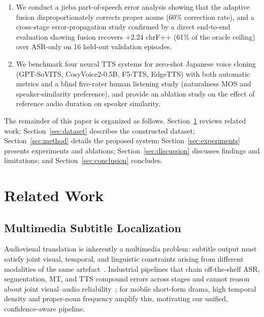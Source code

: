 \documentclass[mathematics,article,submit,xetex,moreauthors]{Definitions/mdpi}
\begin{document}
\begin{enumerate}
 \item We conduct a jieba part-of-speech error analysis showing that the adaptive fusion disproportionately corrects proper nouns (60\% correction rate), and a cross-stage error-propagation study confirmed by a direct end-to-end evaluation showing fusion recovers $+2.24$ chrF++ (61\% of the oracle ceiling) over ASR-only on 16 held-out validation episodes.
 \item We benchmark four neural TTS systems for zero-shot Japanese voice cloning (GPT-SoVITS, CosyVoice2-0.5B, F5-TTS, EdgeTTS) with both automatic metrics and a blind five-rater human listening study (naturalness MOS and speaker-similarity preference), and provide an ablation study on the effect of reference audio duration on speaker similarity.
\end{enumerate}

The remainder of this paper is organized as follows.
Section~\ref{sec:related} reviews related work; Section~\ref{sec:dataset} describes the constructed dataset; Section~\ref{sec:method} details the proposed system; Section~\ref{sec:experiments} presents experiments and ablations; Section~\ref{sec:discussion} discusses findings and limitations; and Section~\ref{sec:conclusion} concludes.

\section{Related Work}
\label{sec:related}

\subsection{Multimedia Subtitle Localization}
Audiovisual translation is inherently a multimedia problem: subtitle output must satisfy joint visual, temporal, and linguistic constraints arising from different modalities of the same artefact~\cite{matusov2019challenges}.
Industrial pipelines that chain off-the-shelf ASR, segmentation, MT, and TTS compound errors across stages and cannot reason about joint visual--audio reliability~\cite{matusov2019challenges}; for mobile short-form drama, high temporal density and proper-noun frequency amplify this, motivating our unified, confidence-aware pipeline.
\end{document}
